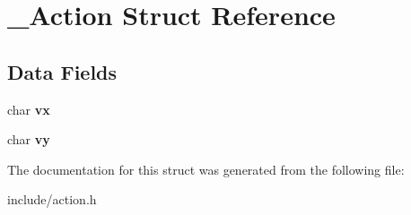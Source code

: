 \hypertarget{struct___action}{\section{\-\_\-\-Action Struct Reference}
\label{struct___action}
}
\subsection*{Data Fields}
\begin{DoxyCompactItemize}
\item 
\hypertarget{struct___action_a72b0fc231f1c6c2e40a1ba070e19826a}{char {\bfseries vx}}\label{struct___action_a72b0fc231f1c6c2e40a1ba070e19826a}

\item 
\hypertarget{struct___action_a6aec0133be72cb5653b6abb9d9bed2e3}{char {\bfseries vy}}\label{struct___action_a6aec0133be72cb5653b6abb9d9bed2e3}

\end{DoxyCompactItemize}


The documentation for this struct was generated from the following file\-:\begin{DoxyCompactItemize}
\item 
include/action.\-h\end{DoxyCompactItemize}
